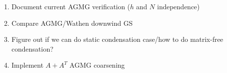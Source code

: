 \documentclass[final,leqno]{siamltex}
\begin{document}
\begin{enumerate}
\item Document current AGMG verification ($h$ and $N$ independence)
\item Compare AGMG/Wathen downwind GS
\item Figure out if we can do static condensation case/how to do matrix-free condensation?  
\item Implement $A+A^T$ AGMG coarsening
\end{enumerate}




\end{document}

